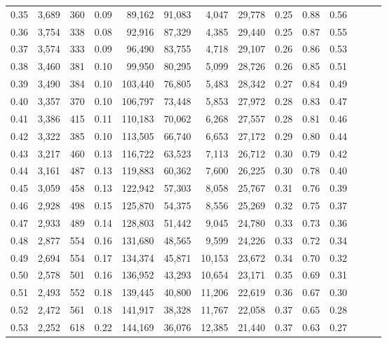 \begin{tabular}{rrrrrrrrrrrrrr}
0.35 &  3,689 &  360 &  0.09 &   89,162 &   91,083 &   4,047 &  29,778 &  0.25 &  0.88 &      0.56 \\
0.36 &  3,754 &  338 &  0.08 &   92,916 &   87,329 &   4,385 &  29,440 &  0.25 &  0.87 &      0.55 \\
0.37 &  3,574 &  333 &  0.09 &   96,490 &   83,755 &   4,718 &  29,107 &  0.26 &  0.86 &      0.53 \\
0.38 &  3,460 &  381 &  0.10 &   99,950 &   80,295 &   5,099 &  28,726 &  0.26 &  0.85 &      0.51 \\
0.39 &  3,490 &  384 &  0.10 &  103,440 &   76,805 &   5,483 &  28,342 &  0.27 &  0.84 &      0.49 \\
0.40 &  3,357 &  370 &  0.10 &  106,797 &   73,448 &   5,853 &  27,972 &  0.28 &  0.83 &      0.47 \\
0.41 &  3,386 &  415 &  0.11 &  110,183 &   70,062 &   6,268 &  27,557 &  0.28 &  0.81 &      0.46 \\
0.42 &  3,322 &  385 &  0.10 &  113,505 &   66,740 &   6,653 &  27,172 &  0.29 &  0.80 &      0.44 \\
0.43 &  3,217 &  460 &  0.13 &  116,722 &   63,523 &   7,113 &  26,712 &  0.30 &  0.79 &      0.42 \\
0.44 &  3,161 &  487 &  0.13 &  119,883 &   60,362 &   7,600 &  26,225 &  0.30 &  0.78 &      0.40 \\
0.45 &  3,059 &  458 &  0.13 &  122,942 &   57,303 &   8,058 &  25,767 &  0.31 &  0.76 &      0.39 \\
0.46 &  2,928 &  498 &  0.15 &  125,870 &   54,375 &   8,556 &  25,269 &  0.32 &  0.75 &      0.37 \\
0.47 &  2,933 &  489 &  0.14 &  128,803 &   51,442 &   9,045 &  24,780 &  0.33 &  0.73 &      0.36 \\
0.48 &  2,877 &  554 &  0.16 &  131,680 &   48,565 &   9,599 &  24,226 &  0.33 &  0.72 &      0.34 \\
0.49 &  2,694 &  554 &  0.17 &  134,374 &   45,871 &  10,153 &  23,672 &  0.34 &  0.70 &      0.32 \\
0.50 &  2,578 &  501 &  0.16 &  136,952 &   43,293 &  10,654 &  23,171 &  0.35 &  0.69 &      0.31 \\
0.51 &  2,493 &  552 &  0.18 &  139,445 &   40,800 &  11,206 &  22,619 &  0.36 &  0.67 &      0.30 \\
0.52 &  2,472 &  561 &  0.18 &  141,917 &   38,328 &  11,767 &  22,058 &  0.37 &  0.65 &      0.28 \\
0.53 &  2,252 &  618 &  0.22 &  144,169 &   36,076 &  12,385 &  21,440 &  0.37 &  0.63 &      0.27 \\

\end{tabular}
